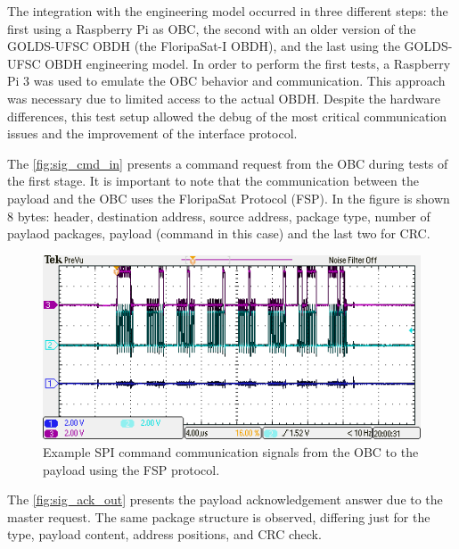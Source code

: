 The integration with the engineering model occurred in three different steps: the first using a Raspberry Pi as OBC, the second with an older version of the GOLDS-UFSC OBDH (the FloripaSat-I OBDH), and the last using the GOLDS-UFSC OBDH engineering model. In order to perform the first tests, a Raspberry Pi 3 was used to emulate the OBC behavior and communication. This approach was necessary due to limited access to the actual OBDH. Despite the hardware differences, this test setup allowed the debug of the most critical communication issues and the improvement of the interface protocol.

The \autoref{fig:sig_cmd_in} presents a command request from the OBC during tests of the first stage. It is important to note that the communication between the payload and the OBC uses the FloripaSat Protocol (FSP). In the figure is shown 8 bytes: header, destination address, source address, package type, number of paylaod packages, payload (command in this case) and the last two for CRC.

\begin{figure}[!ht]
    \begin{center}
        \includegraphics[width=1\textwidth]{figures/fsp_cmd_in.png}
        \caption{Example SPI command communication signals from the OBC to the payload using the FSP protocol.}
        \label{fig:sig_cmd_in}
    \end{center}
\end{figure}

The \autoref{fig:sig_ack_out} presents the payload acknowledgement answer due to the master request. The same package structure is observed, differing just for the type, payload content, address positions, and CRC check.  

